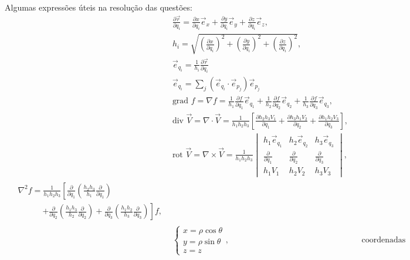 \documentclass[a4paper,12pt, leqno, answers]{exam}
\newcommand{\devp}[2]{\frac{\partial #1}{\partial #2}}
\newcommand{\grad}{\mbox{grad }}
\newcommand{\diver}{\mbox{div }}
\newcommand{\rot}{\mbox{rot }}
\begin{document}
\thispagestyle{empty}

\newpage
\setcounter{page}{1}
Algumas express\~{o}es \'{u}teis na resolu\c{c}\~{a}o das quest\~{o}es:
\begin{align}
    & \devp{\vec{r}}{q_i} = \devp{x}{q_i} \vec{e}_x + \devp{y}{q_i} \vec{e}_y + \devp{z}{q_i} \vec{e}_z,
    \label{eq:vetor_tangente} \\
    & h_i = \sqrt{\left(\devp{x}{q_i}\right)^2 + \left(\devp{y}{q_i}\right)^2 + \left(\devp{z}{q_i}\right)^2},
    \label{eq:fator_escala} \\
    & \vec{e}_{q_i} = \frac{1}{h_i} \devp{\vec{r}}{q_i}
    \label{eq:vetor_tang_unit} \\
    &\vec{e}_{q_i} = \sum_j \left( \vec{e}_{q_i} \cdot \vec{e}_{p_j} \right) \vec{e}_{p_j}
    \label{eq:vetor_mud_coor} \\
    & \grad f = \nabla f = \frac{1}{h_1} \devp{f}{q_1} \vec{e}_{q_1} + \frac{1}{h_2} \devp{f}{q_2} \vec{e}_{q_2} + \frac{1}{h_3} \devp{f}{q_3} \vec{e}_{q_3},
    \label{eq:grad} \\
    & \diver \vec{V} = \nabla \cdot \vec{V} = \frac{1}{h_1 h_2 h_3} \left[\devp{h_2 h_3 V_1}{q_1} + \devp{h_3 h_1 V_2}{q_2} + \devp{h_1 h_2 V_3}{q_3}\right],
    \label{eq:div} \\
    & \rot \vec{V} = \nabla \times \vec{V} = \frac{1}{h_1 h_2 h_3} \begin{vmatrix}
        h_1 \vec{e}_{q_1} & h_2 \vec{e}_{q_2} & h_3 \vec{e}_{q_3} \\
        \devp{}{q_1}      & \devp{}{q_2}      & \devp{}{q_3}      \\
        h_1 V_1           & h_2 V_2           & h_3 V_3           
    \end{vmatrix},
    \label{eq:rot} \\
    \begin{split}
        & \nabla^2 f = \frac{1}{h_1 h_2 h_3} \left[\devp{}{q_1}\left(\frac{h_2 h_3}{h_1} \devp{}{q_1}\right)\right. \\ &\qquad\quad\left. + \devp{}{q_2}\left(\frac{h_1 h_3}{h_2} \devp{}{q_2}\right) + \devp{}{q_3}\left(\frac{h_1 h_2}{h_3} \devp{}{q_3}\right)\right] f,
    \end{split}
    \label{eq:laplaciano} \\
    & \begin{cases}
        x = \rho \cos \theta \\
        y = \rho \sin \theta \\
        z = z
    \end{cases}, && \text{coordenadas cil\'{i}ndricas}

\end{align}
\end{document}
